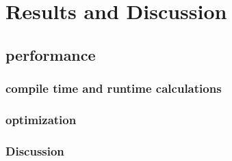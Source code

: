 
\chapter{Results and Discussion}

\section{performance}

\subsection{compile time and runtime calculations}

\subsection{optimization}

\subsection{Discussion}




